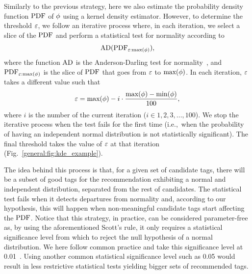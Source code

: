 Similarly to the previous strategy, here we also estimate the probability density function $\text{PDF}$ of $\phi$ using a kernel density estimator. However, to determine the threshold $\varepsilon$, we follow an iterative process where, in each iteration, we select a slice of the $\text{PDF}$ and perform a statistical test for normality according to
\begin{equation}
  \label{general:eq:ad}
  \text{AD}(\text{PDF}_{\varepsilon : \text{max}(\phi)}),
\end{equation}
where the function $\text{AD}$ is the Anderson-Darling test for normality~\citep{scho1987}, and $\text{PDF}_{\varepsilon : \text{max}(\phi)}$ is the slice of $\text{PDF}$ that goes from $\varepsilon$ to $\text{max}(\phi)$. 
In each iteration, $\varepsilon$ takes a different value such that 
\begin{equation}
  \varepsilon = \text{max}(\phi) - i \cdot \frac{\text{max}(\phi)-\text{min}(\phi)}{100},
\end{equation}
where $i$ is the number of the current iteration ($i \in 1, 2, 3, ..., 100$). We stop the iterative process when the test fails for the first time (i.e.,~when the probability of having an independent normal distribution is not statistically significant). The final threshold takes the value of $\varepsilon$ at that iteration (Fig.~\ref{general:fig:kde_example}).

The idea behind this process is that, for a given set of candidate tags, there will be a subset of good tags for the recommendation exhibiting a normal and independent distribution, separated from the rest of candidates. The statistical test fails when it detects departures from normality and, according to our hypothesis, this will happen when non-meaningful candidate tags start affecting the $\text{PDF}$. Notice that this strategy, in practice, can be considered parameter-free as, by using the aforementioned Scott's rule, it only requires a statistical significance level from which to reject the null hypothesis of a normal distribution. We here follow common practice and take this significance level at 0.01~\citep{scho1987}. Using another common statistical significance level such as 0.05 would result in less restrictive statistical tests yielding bigger sets of recommended tags.

